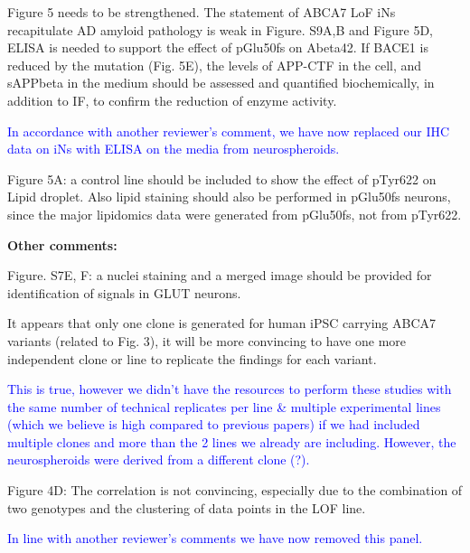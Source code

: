 Figure 5 needs to be strengthened. The statement of ABCA7 LoF iNs recapitulate AD amyloid pathology is weak in Figure. S9A,B and Figure 5D, ELISA is needed to support the effect of pGlu50fs on Abeta42. If BACE1 is reduced by the mutation (Fig. 5E), the levels of APP-CTF in the cell, and sAPPbeta in the medium should be assessed and quantified biochemically, in addition to IF, to confirm the reduction of enzyme activity.

\textcolor{blue}{In accordance with another reviewer’s comment, we have now replaced our IHC data on iNs with ELISA on the media from neurospheroids.}

Figure 5A: a control line should be included to show the effect of pTyr622 on Lipid droplet. Also lipid staining should also be performed in pGlu50fs neurons, since the major lipidomics data were generated from pGlu50fs, not from pTyr622.

\textbf{Other comments:}

Figure. S7E, F: a nuclei staining and a merged image should be provided for identification of signals in GLUT neurons.

It appears that only one clone is generated for human iPSC carrying ABCA7 variants (related to Fig. 3), it will be more convincing to have one more independent clone or line to replicate the findings for each variant.

\textcolor{blue}{This is true, however we didn’t have the resources to perform these studies with the same number of technical replicates per line & multiple experimental lines (which we believe is high compared to previous papers) if we had included multiple clones and more than the 2 lines we already are including. However, the neurospheroids were derived from a different clone (?).}

Figure 4D: The correlation is not convincing, especially due to the combination of two genotypes and the clustering of data points in the LOF line.

\textcolor{blue}{In line with another reviewer’s comments we have now removed this panel.}

